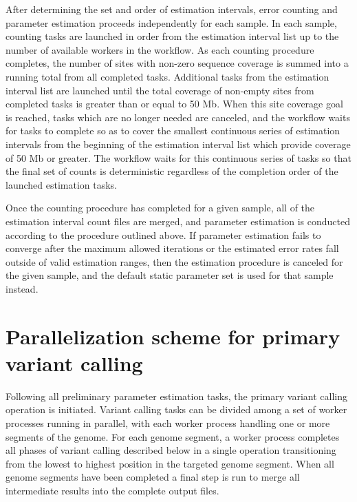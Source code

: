 \documentclass{article}
\begin{document}
After determining the set and order of estimation intervals, error counting and parameter estimation proceeds independently for each sample. In each sample, counting tasks are launched in order from the estimation interval list up to the number of available workers in the workflow. As each counting procedure completes, the number of sites with non-zero sequence coverage is summed into a running total from all completed tasks. Additional tasks from the estimation interval list are launched until the total coverage of non-empty sites from completed tasks is greater than or equal to 50 Mb. When this site coverage goal is reached, tasks which are no longer needed are canceled, and the workflow waits for tasks to complete so as to cover the smallest continuous series of estimation intervals from the beginning of the estimation interval list which provide coverage of 50 Mb or greater. The workflow waits for this continuous series of tasks so that the final set of counts is deterministic regardless of the completion order of the launched estimation tasks.

Once the counting procedure has completed for a given sample, all of the estimation interval count files are merged, and parameter estimation is conducted according to the procedure outlined above. If parameter estimation fails to converge after the maximum allowed iterations or the estimated error rates fall outside of valid estimation ranges, then the estimation procedure is canceled for the given sample, and the default static parameter set is used for that sample instead.

\section{Parallelization scheme for primary variant calling}

Following all preliminary parameter estimation tasks, the primary variant calling operation is initiated. Variant calling tasks can be divided among a set of worker processes running in parallel, with each worker process handling one or more segments of the genome. For each genome segment, a worker process completes all phases of variant calling described below in a single operation transitioning from the lowest to highest position in the targeted genome segment. When all genome segments have been completed a final step is run to merge all intermediate results into the complete output files.
\end{document}

